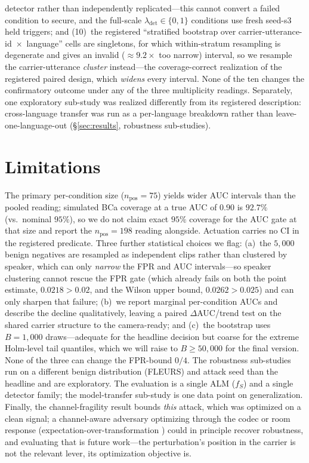 \documentclass[letterpaper,twocolumn,10pt]{article}
\newcommand{\lam}{\lambda_{\mathrm{det}}}
\newcommand{\fs}{f_{S}}
\begin{document}
detector rather than independently replicated---this cannot convert a failed
condition to secure, and the full-scale $\lam\in\{0,1\}$ conditions use fresh
seed-s3 held triggers; and (10)~the registered ``stratified bootstrap over
carrier-utterance-id~$\times$~language'' cells are singletons, for which
within-stratum resampling is degenerate and gives an invalid (${\approx}9.2\times$
too narrow) interval, so we resample the carrier-utterance \emph{cluster}
instead---the coverage-correct realization of the registered paired design, which
\emph{widens} every interval. None of the ten changes
the confirmatory outcome under any of the three multiplicity readings. Separately,
one exploratory sub-study was realized differently from its registered description:
cross-language transfer was run as a per-language breakdown rather than
leave-one-language-out (\S\ref{sec:results}, robustness sub-studies).

\section{Limitations}
The primary per-condition size ($n_{\mathrm{pos}}=75$) yields wider AUC intervals
than the pooled reading; simulated BCa coverage at a true AUC of $0.90$ is
$92.7\%$ (vs.\ nominal $95\%$), so we do not claim exact $95\%$ coverage for the
AUC gate at that size and report the $n_{\mathrm{pos}}=198$ reading alongside.
Actuation carries no CI in the registered predicate. Three further statistical
choices we flag: (a)~the $5{,}000$ benign negatives are resampled as independent
clips rather than clustered by speaker, which can only \emph{narrow} the FPR and
AUC intervals---so speaker clustering cannot rescue the FPR gate (which already
fails on both the point estimate, $0.0218>0.02$, and the Wilson upper bound,
$0.0262>0.025$) and can only sharpen that failure; (b)~we report marginal
per-condition AUCs and describe the decline qualitatively, leaving a paired
$\Delta$AUC/trend test on the shared carrier structure to the camera-ready; and
(c)~the bootstrap uses $B{=}1{,}000$ draws---adequate for the headline decision but
coarse for the extreme Holm-level tail quantiles, which we will raise to
$B{\geq}50{,}000$ for the final version. None of the three can change the
FPR-bound $0/4$. The robustness sub-studies
run on a different benign distribution (FLEURS) and attack seed than the headline
and are exploratory. The evaluation is a single ALM ($\fs$) and a single detector
family; the model-transfer sub-study is one data point on generalization. Finally,
the channel-fragility result bounds \emph{this} attack, which was optimized on a
clean signal; a channel-aware adversary optimizing through the codec or room
response (expectation-over-transformation \cite{eot}) could in principle recover
robustness, and evaluating that is future work---the perturbation's position in
the carrier is not the relevant lever, its optimization objective is.
\end{document}
